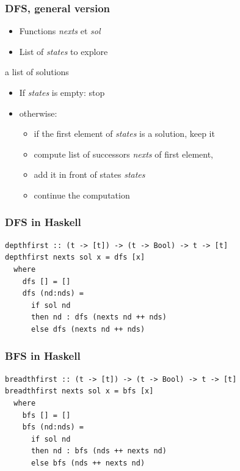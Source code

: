 \begin{frame}[fragile]\frametitle{DFS, general version}

\begin{itemize}
\item Functions \emph{nexts} et \emph{sol}
\item List of \emph{states} to explore
\end{itemize}

 a list of solutions

\begin{itemize}
\item If \emph{states} is empty: stop
\item otherwise:
  \begin{itemize}
  \item if the first element of \emph{states} is a solution, keep it
  \item compute list of successors \emph{nexts} of first element,
  \item add it in front of states \emph{states}
  \item continue the computation
  \end{itemize}
\end{itemize}

\end{frame}

\begin{frame}[fragile]\frametitle{DFS in Haskell}

\begin{lstlisting}
depthfirst :: (t -> [t]) -> (t -> Bool) -> t -> [t]
depthfirst nexts sol x = dfs [x]
  where
    dfs [] = []
    dfs (nd:nds) =
      if sol nd
      then nd : dfs (nexts nd ++ nds)
      else dfs (nexts nd ++ nds)
\end{lstlisting}

\end{frame}

\begin{frame}[fragile]\frametitle{BFS in Haskell}

\begin{lstlisting}
breadthfirst :: (t -> [t]) -> (t -> Bool) -> t -> [t]
breadthfirst nexts sol x = bfs [x]
  where
    bfs [] = []
    bfs (nd:nds) =
      if sol nd
      then nd : bfs (nds ++ nexts nd)
      else bfs (nds ++ nexts nd)
\end{lstlisting}

\end{frame}


